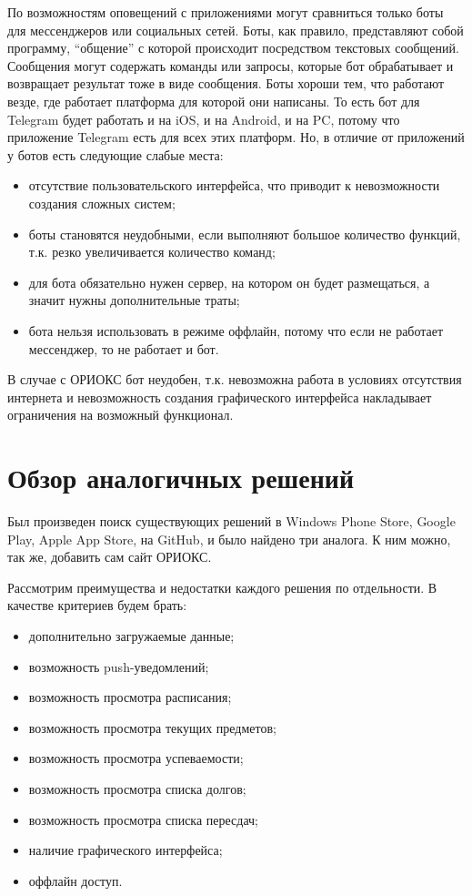 По возможностям оповещений с приложениями могут сравниться только боты для мессенджеров или социальных сетей.
Боты, как правило, представляют собой программу, ``общение'' с которой происходит посредством текстовых сообщений.
Сообщения могут содержать команды или запросы, которые бот обрабатывает и возвращает результат тоже в виде сообщения.
Боты хороши тем, что работают везде, где работает платформа для которой они написаны.
То есть бот для Telegram будет работать и на iOS, и на Android, и на PC, потому что приложение Telegram есть для всех этих платформ.
Но, в отличие от приложений у ботов есть следующие слабые места:
\begin{itemize}
  \item отсутствие пользовательского интерфейса, что приводит к невозможности создания сложных систем;
  \item боты становятся неудобными, если выполняют большое количество функций, т.к. резко увеличивается количество команд;
  \item для бота обязательно нужен сервер, на котором он будет размещаться, а значит нужны дополнительные траты;
  \item бота нельзя использовать в режиме оффлайн, потому что если не работает мессенджер, то не работает и бот.
\end{itemize}

В случае с ОРИОКС бот неудобен, т.к. невозможна работа в условиях отсутствия интернета и невозможность создания графического интерфейса накладывает ограничения на возможный функционал.

\section{Обзор аналогичных решений}
\label{sec:analogs}
Был произведен поиск существующих решений в Windows Phone Store, Google Play, Apple App Store, на GitHub, и было найдено три аналога.
К ним можно, так же, добавить сам сайт ОРИОКС.

Рассмотрим преимущества и недостатки каждого решения по отдельности.
В качестве критериев будем брать:
\begin{itemize}
  \item дополнительно загружаемые данные;
  \item возможность push-уведомлений;
  \item возможность просмотра расписания;
  \item возможность просмотра текущих предметов;
  \item возможность просмотра успеваемости;
  \item возможность просмотра списка долгов;
  \item возможность просмотра списка пересдач;
  \item наличие графического интерфейса;
  \item оффлайн доступ.
\end{itemize}


